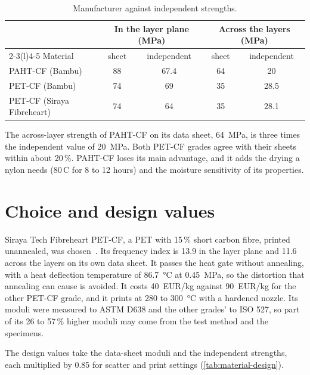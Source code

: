 \begin{table}[htbp]
\centering\small
\caption{Manufacturer against independent strengths.}\label{tab:material-independent}
\begin{tabular}{@{}lcccc@{}}
\toprule
& \multicolumn{2}{c}{In the layer plane (MPa)} & \multicolumn{2}{c}{Across the layers (MPa)}\\
\cmidrule(lr){2-3}\cmidrule(l){4-5}
Material & sheet & independent & sheet & independent\\
\midrule
PAHT-CF (Bambu) & 88 & 67.4 & 64 & 20\\
PET-CF (Bambu) & 74 & 69 & 35 & 28.5\\
PET-CF (Siraya Fibreheart) & 74 & 64 & 35 & 28.1\\
\bottomrule
\end{tabular}
\end{table}

The across-layer strength of PAHT-CF on its data sheet, \SI{64}{MPa}, is three times the independent value of \SI{20}{MPa}. Both PET-CF grades agree with their sheets within about 20\,\%. PAHT-CF loses its main advantage, and it adds the drying a nylon needs (80\,\textdegree C for 8 to 12 hours) and the moisture sensitivity of its properties.

\section{Choice and design values}\label{sec:material-choice}

Siraya Tech Fibreheart PET-CF, a PET with 15\,\% short carbon fibre, printed unannealed, was chosen~\citep{siraya_petcf}. Its frequency index is 13.9 in the layer plane and 11.6 across the layers on its own data sheet. It passes the heat gate without annealing, with a heat deflection temperature of \SI{86.7}{\celsius} at \SI{0.45}{MPa}, so the distortion that annealing can cause is avoided. It costs \SI{40}{EUR/kg} against \SI{90}{EUR/kg} for the other PET-CF grade, and it prints at 280 to \SI{300}{\celsius} with a hardened nozzle. Its moduli were measured to ASTM D638 and the other grades' to ISO 527, so part of its 26 to 57\,\% higher moduli may come from the test method and the specimens.

The design values take the data-sheet moduli and the independent strengths, each multiplied by 0.85 for scatter and print settings (\cref{tab:material-design}).

